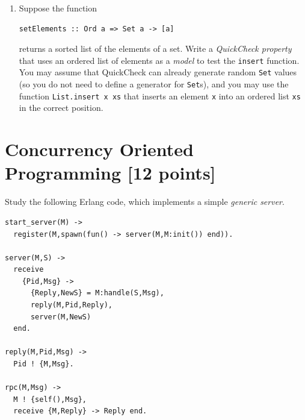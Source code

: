 \documentclass{article}
\begin{document}
\begin{enumerate}
\begin{enumerate}
{\em Hint:} you will find you need a function to join together the
left and right subtrees of a branch-node into a single tree. You can
use the following function to do this:
\begin{verbatim}
join Leaf t = t
join (Branch l b r) t = Branch l b (join r t)
\end{verbatim}
There is no need to repeat this definition in your answer.

\item
Suppose the function
\begin{verbatim}
setElements :: Ord a => Set a -> [a]
\end{verbatim}
returns a sorted list of the elements of a set. Write a {\em
  QuickCheck property} that uses an ordered list of elements as a {\em
  model} to test the \verb!insert! function.  You may assume that
QuickCheck can already generate random \verb!Set! values (so you do
not need to define a generator for \verb!Set!s), and you may use the
function \verb!List.insert x xs! that inserts an element \verb!x! into
an ordered list \verb!xs! in the correct position.  



\end{enumerate}




\end{enumerate}

\newpage
\section{Concurrency Oriented Programming [12 points]}

Study the following Erlang code, which implements a simple {\em generic server}.
\begin{verbatim}
start_server(M) ->
  register(M,spawn(fun() -> server(M,M:init()) end)).

server(M,S) ->
  receive
    {Pid,Msg} ->
      {Reply,NewS} = M:handle(S,Msg),
      reply(M,Pid,Reply),
      server(M,NewS)
  end.

reply(M,Pid,Msg) ->
  Pid ! {M,Msg}.

rpc(M,Msg) ->
  M ! {self(),Msg},
  receive {M,Reply} -> Reply end.
\end{verbatim}
\end{document}
